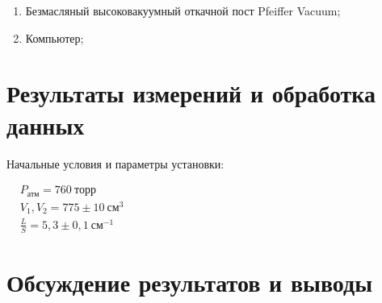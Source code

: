 \documentclass[a4paper, 12pt]{article}
\begin{document}
\begin{enumerate}
    \item Безмасляный высоковакуумный откачной пост Pfeiffer Vacuum;
    \item Компьютер;
\end{enumerate}

\section{Результаты измерений и обработка данных}

Начальные условия и параметры установки:

$\begin{aligned}
& P_{\text{атм}} = 760~торр\\
& V_1, V_2 = 775\pm10~см^3 \\
& \frac{L}{S} = 5,3\pm0,1~см^{-1}
\end{aligned}$\\[0,5 cm]



\section{Обсуждение результатов и выводы}
\end{document}
